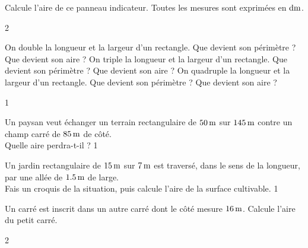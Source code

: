 \documentclass[a4paper,11pt]{report}
\let\oldcenter\center
\let\oldendcenter\endcenter
\renewenvironment{center}{\setlength\topsep{-10pt}\oldcenter}{\oldendcenter}
\begin{document}
\begin{exo}{
    Calcule l'aire de ce panneau indicateur. 
    Toutes les mesures sont exprimées en $\tunit{}{dm}$.
    \begin{center}
        
    \end{center}
}{2}    
\end{exo}



\begin{exo}{
		\vspace{-0.5cm}
\begin{tasks}[after-item-skip = 0.2em]
    \task On double la longueur et la largeur d'un rectangle. Que devient son périmètre ? Que devient son aire ?
    \task On triple la longueur et la largeur d'un rectangle. Que devient son périmètre ? Que devient son aire ?
    \task On quadruple la longueur et la largeur d'un rectangle. Que devient son périmètre ? Que devient son aire ?
\end{tasks}
}{1}    
\end{exo}



\begin{exo}{
		Un paysan veut échanger un terrain rectangulaire de $\tunit{50}{m}$ sur $\tunit{145}{m}$ contre un champ carré de $\tunit{85}{m}$ de côté. \\ Quelle aire perdra-t-il ?
}{1}    
\end{exo}

\begin{exo}{
		Un jardin rectangulaire de $\tunit{15}{m}$ sur $\tunit{7}{m}$ est traversé, dans le sens de la longueur, par une allée de $\tunit{1,5}{m}$ de large. \\ Fais un croquis de la situation, puis calcule l'aire de la surface cultivable.
}{1}
\end{exo}

\begin{exo}{
		Un carré est inscrit dans un autre carré dont le côté mesure $\tunit{16}{m}$. Calcule l'aire du petit carré.
\begin{center}
\end{center}

}{2}    
\end{exo}
\end{document}
